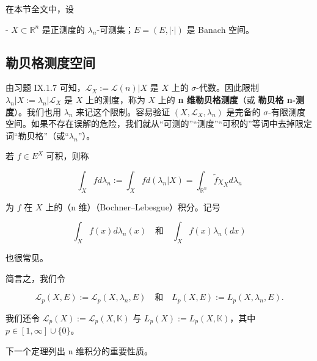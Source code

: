 在本节全文中，设

- $ X \subset \mathbb{R}^{n} $ 是正测度的 $ \lambda_{n} $-可测集；$ E = (E,|\cdot|) $ 是 Banach 空间。

\subsection*{勒贝格测度空间}

由习题 IX.1.7 可知，$ \mathcal{L}_{X} := \mathcal{L}(n)|X $ 是 $ X $ 上的 $ \sigma $-代数。因此限制 $ \lambda_{n}|X := \lambda_{n}|\mathcal{L}_{X} $ 是 $ X $ 上的测度，称为 $ X $ 上的 \textbf{n 维勒贝格测度}（或 \textbf{勒贝格 n-测度}）。我们也用 $ \lambda_{n} $ 来记这个限制。容易验证 $ (X,\mathcal{L}_{X},\lambda_{n}) $ 是完备的 $ \sigma $-有限测度空间。如果不存在误解的危险，我们就从“可测的”“测度”“可积的”等词中去掉限定词“勒贝格”（或“$ \lambda_{n} $”）。

若 $ f \in E^{X} $ 可积，则称

\[
\int_{X} f d\lambda_{n} := \int_{X} f d(\lambda_{n}|X) = \int_{\mathbb{R}^{n}} \widetilde{f}\chi_{X} d\lambda_{n}
\]

为 $ f $ 在 $ X $ 上的（n 维）（Bochner–Lebesgue）积分。记号

\[
\int_{X} f(x) d\lambda_{n}(x) \quad \text{和} \quad \int_{X} f(x) \lambda_{n}(dx)
\]

也很常见。

简言之，我们令

\[
\mathcal{L}_{p}(X,E) := \mathcal{L}_{p}(X,\lambda_{n},E) \quad \text{和} \quad L_{p}(X,E) := L_{p}(X,\lambda_{n},E) .
\]

我们还令 $ \mathcal{L}_{p}(X) := \mathcal{L}_{p}(X,\mathbb{K}) $ 与 $ L_{p}(X) := L_{p}(X,\mathbb{K}) $，其中 $ p \in [1,\infty] \cup \{0\} $。

下一个定理列出 n 维积分的重要性质。

